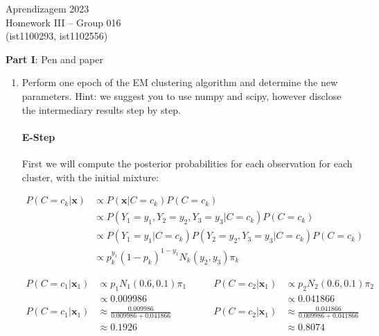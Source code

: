 \documentclass[12pt]{article}
\begin{document}
\newcommand{\prob}{\textrm{P}}
\newcommand{\ind}{\perp\!\!\!\!\!\perp} 
\newcommand{\notind}{\not\perp\!\!\!\!\!\perp}
\newcommand{\defeq}{\vcentcolon=}

\center
Aprendizagem 2023\\
Homework III -- Group 016\\
(ist1100293, ist1102556)\vskip 1cm

\large{\textbf{Part I}: Pen and paper}\normalsize

\begin{enumerate}[leftmargin=\labelsep]
    \item Perform one epoch of the EM clustering algorithm and determine the new parameters.
    Hint: we suggest you to use numpy and scipy, however disclose the intermediary results step by step.

    \paragraph{E-Step} First we will compute the posterior probabilities for each observation for each cluster, with the initial mixture:

    \begin{equation}
    \begin{aligned}
        P(C=c_k|\mathbf{x}) &\propto P(\mathbf{x}|C=c_k)P(C=c_k) \\
        &\propto P(Y_1 = y_1, Y_2 = y_2, Y_3= y_3|C=c_k)P(C=c_k) \\
        &\propto P(Y_1 = y_1|C=c_k)P(Y_2 = y_2, Y_3=y_3|C=c_k)P(C=c_k) \\
        &\propto p_k^{y_1}(1-p_k)^{1-y_1}N_k(y_2, y_3)\pi_k
    \end{aligned}
    \end{equation}

    \begin{equation}
    \begin{aligned}
        P(C=c_1|\mathbf{x}_1) &\propto p_1N_1(0.6, 0.1)\pi_1 &\qquad P(C=c_2|\mathbf{x}_1) &\propto p_2N_2(0.6, 0.1)\pi_2 \\
        &\propto 0.009986 &\qquad &\propto 0.041866 \\
        P(C=c_1|\mathbf{x}_1) &\approx \frac{0.009986}{0.009986+0.041866} &\qquad P(C=c_2|\mathbf{x}_1) &\approx \frac{0.041866}{0.009986+0.041866} \\
        &\approx 0.1926 &\qquad &\approx 0.8074
    \end{aligned}
    \end{equation}


\end{enumerate}
\end{document}
